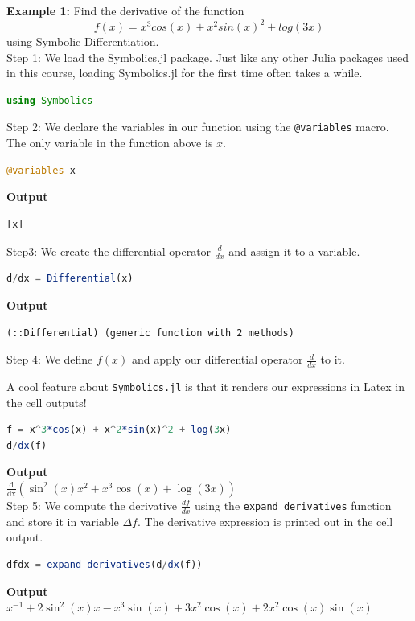 \textbf{Example 1:} Find the derivative of the function 
$$f(x) = x^3cos(x) + x^2sin(x)^2 + log(3x)$$
using Symbolic Differentiation. \\

Step 1: We load the Symbolics.jl package. Just like any other Julia packages used in this course, loading Symbolics.jl for the first time often takes a while.

\begin{lstlisting}[language=Julia,style=mystyle]
 using Symbolics
\end{lstlisting}

Step 2: We declare the variables in our function using the \texttt{@variables} macro. The only variable in the function above is $x$.

\begin{lstlisting}[language=Julia,style=mystyle]
@variables x
\end{lstlisting}
\textbf{Output} 
\begin{verbatim}
[x]
\end{verbatim}

Step3: We create the differential operator $\frac{d}{d x}$ and assign it to a variable. 

\begin{lstlisting}[language=Julia,style=mystyle]
d/dx = Differential(x)
\end{lstlisting}
\textbf{Output} 
\begin{verbatim}
(::Differential) (generic function with 2 methods)
\end{verbatim}

Step 4: We define $f(x)$ and apply our differential operator  $\frac{d}{d x}$ to it. 

A cool feature about \texttt{Symbolics.jl} is that it renders our expressions in Latex in the cell outputs!
\begin{lstlisting}[language=Julia,style=mystyle]
f = x^3*cos(x) + x^2*sin(x)^2 + log(3x)
d/dx(f)
\end{lstlisting}
\textbf{Output} \\
$\mathrm{\frac{d}{d x}}\left( \sin^{2}\left( x \right) x^{2} + x^{3} \cos\left( x \right) + \log\left( 3 x \right) \right)$\\

Step 5: We compute the derivative $\frac{d f}{d x}$  using the \texttt{expand\_derivatives} function and store it in variable $\Delta f$. The derivative expression is printed out in the cell output.

\begin{lstlisting}[language=Julia,style=mystyle]
dfdx = expand_derivatives(d/dx(f)) 
\end{lstlisting}
\textbf{Output} \\
$x^{-1} + 2 \sin^{2}\left( x \right) x - x^{3} \sin\left( x \right) + 3 x^{2} \cos\left( x \right) + 2 x^{2} \cos\left( x \right) \sin\left( x \right)$\\

